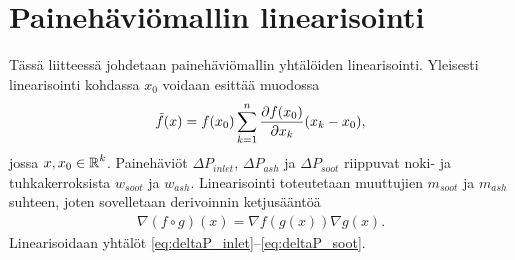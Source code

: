 
\chapter{Painehäviömallin linearisointi}%
\label{ch:linearisointi}

Tässä liitteessä johdetaan painehäviömallin yhtälöiden linearisointi. Yleisesti linearisointi kohdassa \(x_0\) voidaan esittää muodossa
\begin{align}
    \tilde{f}(x) = f(x_0) \sum_{k=1}^n \frac{\partial f(x_0)}{\partial x_k} (x_k-x_0),
\end{align}
jossa \(x, x_0 \in \operatorname{\mathbb{R}}^k\). 
Painehäviöt \(\Delta P_{inlet}\), \(\Delta P_{ash}\) ja \(\Delta P_{soot}\) riippuvat noki- ja tuhkakerroksista \(w_{soot}\) ja \(w_{ash}\). 
Linearisointi toteutetaan muuttujien \(m_{soot}\) ja \( m_{ash}\) suhteen, joten
sovelletaan derivoinnin ketjusääntöä
\begin{align}
    \nabla (f \circ g)(x) = \nabla f(g(x))\nabla g(x).
\end{align}
Linearisoidaan  yhtälöt \eqref{eq:deltaP_inlet}--\eqref{eq:deltaP_soot}.




